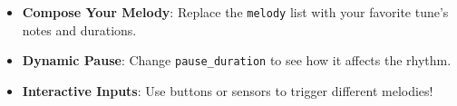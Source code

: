 \documentclass{article}
\begin{document}
	\begin{itemize}
		\item \textbf{Compose Your Melody}: Replace the \texttt{melody} list with your favorite tune’s notes and durations.
		\item \textbf{Dynamic Pause}: Change \texttt{pause\_duration} to see how it affects the rhythm.
		\item \textbf{Interactive Inputs}: Use buttons or sensors to trigger different melodies!
	\end{itemize}
	
\end{document}
